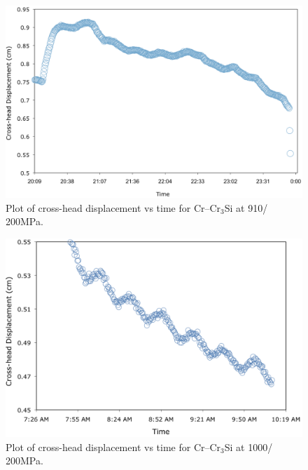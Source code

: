 %
\begin{figure}[H]
\begin{center}
\includegraphics[width=14cm]{enginxcr910C200MPa}
\vspace{-2mm}
\caption{Plot of cross-head displacement vs time for Cr--Cr$_3$Si at 910\celsius/ 200MPa.}
\label{fig:enginxcr910C200MPa7}
\end{center}
\end{figure}  
%
%
\begin{figure}[H]
\begin{center}
\includegraphics[width=14.4cm]{enginxcr1000C200MPa}
\vspace{-2mm}
\caption{Plot of cross-head displacement vs time for Cr--Cr$_3$Si at 1000\celsius/ 200MPa.}
\label{fig:enginxcr1000C200MPa7}
\end{center}
\end{figure}  
%

